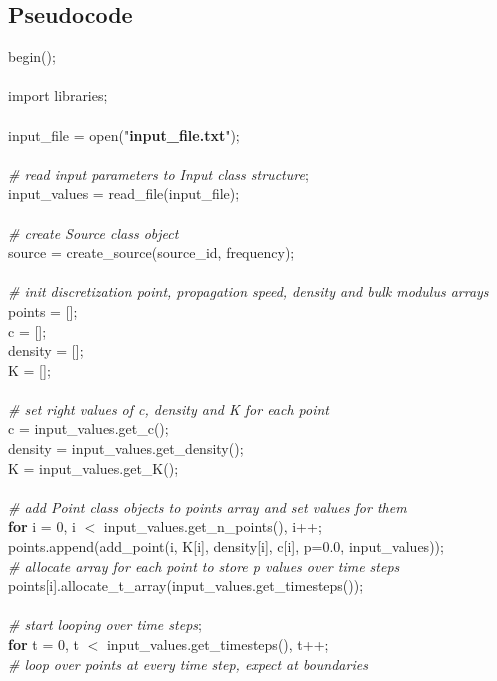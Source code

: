 \documentclass[]{article}
\begin{document}
\subsection{Pseudocode}
begin(); \\
\\
import libraries; \\
\\
input\_file = open("\textbf{input\_file.txt}"); \\
\\
\textit{\# read input parameters to Input class structure}; \\
input\_values = read\_file(input\_file); \\
\\
\textit{\# create Source class object} \\
source = create\_source(source\_id, frequency); \\
\\
\textit{\# init discretization point, propagation speed, density and bulk modulus arrays} \\
points = []; \\
c = []; \\
density = []; \\
K = []; \\
\\
\textit{\# set right values of c, density and K for each point} \\
c = input\_values.get\_c(); \\
density = input\_values.get\_density(); \\
K = input\_values.get\_K(); \\
\\
\textit{\# add Point class objects to points array and set values for them} \\
\textbf{for} i = 0, i $<$ input\_values.get\_n\_points(), i++; \\
\indent points.append(add\_point(i, K[i], density[i], c[i], p=0.0, input\_values)); \\
\indent \textit{\# allocate array for each point to store p values over time steps} \\
\indent points[i].allocate\_t\_array(input\_values.get\_timesteps()); \\
\\
\textit{\# start looping over time steps}; \\
\textbf{for} t = 0, t $<$ input\_values.get\_timesteps(), t++; \\
\indent \textit{\# loop over points at every time step, expect at boundaries} \\
\end{document}

